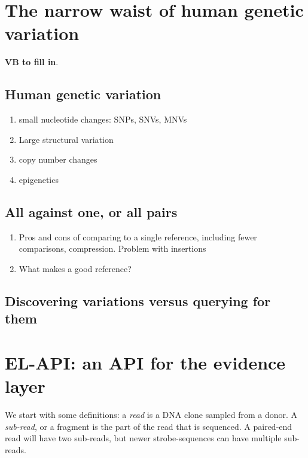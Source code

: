 \documentclass[11pt]{article}
\begin{document}
\section{The narrow waist of human genetic variation}
\label{sec:geneticvariation}
{\bf VB to fill in}.
\subsection{Human genetic variation}
\begin{enumerate}
\item small nucleotide changes: SNPs, SNVs, MNVs
\item Large structural variation
\item copy number changes
\item epigenetics
\end{enumerate}

\subsection{All against one, or all pairs}
\begin{enumerate}
\item Pros and cons of comparing to a single reference, including fewer comparisons, compression. Problem with insertions
\item What makes a good reference?
\end{enumerate}

\subsection{Discovering variations versus querying for them}

\section{EL-API: an API for the evidence layer}
We start with some definitions: a \emph{read} is a DNA clone sampled
from a donor. A \emph{sub-read}, or a fragment is the part of the read
that is sequenced. A paired-end read will have two sub-reads, but
newer strobe-sequences can have multiple sub-reads.
\end{document}
